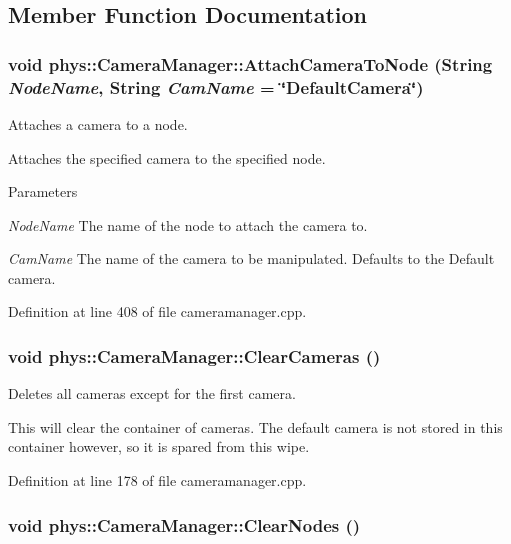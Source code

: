 \subsection{Member Function Documentation}
\hypertarget{classphys_1_1CameraManager_a1cde365b6cab80a33ddf7046489f7af9}{
\subsubsection[{AttachCameraToNode}]{\setlength{\rightskip}{0pt plus 5cm}void phys::CameraManager::AttachCameraToNode ({\bf String} {\em NodeName}, \/  {\bf String} {\em CamName} = {\ttfamily \char`\"{}DefaultCamera\char`\"{}})}}
\label{d9/d91/classphys_1_1CameraManager_a1cde365b6cab80a33ddf7046489f7af9}


Attaches a camera to a node. 

Attaches the specified camera to the specified node. 
\begin{DoxyParams}{Parameters}
\item[{\em NodeName}]The name of the node to attach the camera to. \item[{\em CamName}]The name of the camera to be manipulated. Defaults to the Default camera. \end{DoxyParams}


Definition at line 408 of file cameramanager.cpp.

\hypertarget{classphys_1_1CameraManager_a76bebee0820fcfa462412cb112b1b874}{
\subsubsection[{ClearCameras}]{\setlength{\rightskip}{0pt plus 5cm}void phys::CameraManager::ClearCameras ()}}
\label{d9/d91/classphys_1_1CameraManager_a76bebee0820fcfa462412cb112b1b874}


Deletes all cameras except for the first camera. 

This will clear the container of cameras. The default camera is not stored in this container however, so it is spared from this wipe. 

Definition at line 178 of file cameramanager.cpp.

\hypertarget{classphys_1_1CameraManager_a42d91612bbaa00187944290d6bfd44e9}{
\subsubsection[{ClearNodes}]{\setlength{\rightskip}{0pt plus 5cm}void phys::CameraManager::ClearNodes ()}}
\label{d9/d91/classphys_1_1CameraManager_a42d91612bbaa00187944290d6bfd44e9}


